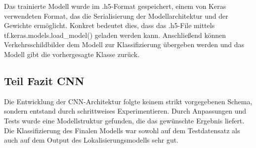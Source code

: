 \documentclass[runningheads]{llncs}
\begin{document}
Das trainierte Modell wurde im .h5-Format gespeichert, einem von Keras verwendeten Format, das die Serialisierung der
Modellarchitektur und der Gewichte ermöglicht. Konkret bedeutet dies, dass das .h5-File mittels tf.keras.models.load_model()
geladen werden kann. Anschließend können Verkehrsschildbilder dem Modell zur Klassifizierung übergeben werden und das Modell
gibt die vorhergesagte Klasse zurück.

\subsection{Teil Fazit CNN}
Die Entwicklung der CNN-Architektur folgte keinem strikt vorgegebenen Schema, sondern entstand durch schrittweises Experimentieren.
Durch Anpassungen und Tests wurde eine Modellstruktur gefunden, die das gewünschte Ergebnis liefert. Die Klassifizierung des
Finalen Modells war sowohl auf dem Testdatensatz als auch auf dem Output des Lokalisierungsmodells sehr gut.





\end{document}
